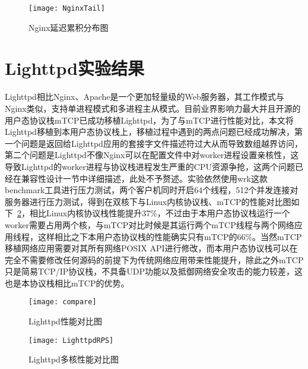 \vspace{-10pt}
\begin{figure}[H] %
  \centering
  \texttt{[image: NginxTail]}
  \caption{Nginx延迟累积分布图}
  \label{fig:NginxTail}
\end{figure}
\vspace{-10pt}

\section{Lighttpd实验结果}
Lighttpd相比Nginx、Apache是一个更加轻量级的Web服务器，其工作模式与Nginx类似，支持单进程模式和多进程主从模式。目前业界影响力最大并且开源的用户态协议栈mTCP已成功移植Lighttpd，为了与mTCP进行性能对比，本文将Lighttpd移植到本用户态协议栈上，移植过程中遇到的两点问题已经成功解决，第一个问题是返回给Lighttpd应用的套接字文件描述符过大从而导致数组越界访问，第二个问题是Lighttpd不像Nginx可以在配置文件中对worker进程设置亲核性，这导致Lighttpd的worker进程与协议栈进程发生严重的CPU资源争抢，这两个问题已经在兼容性设计一节中详细描述，此处不予赘述。实验依然使用wrk这款benchmark工具进行压力测试，两个客户机同时开启64个线程，512个并发连接对服务器进行压力测试，得到在双核下与Linux内核协议栈、mTCP的性能对比图如下~\ref{fig:compare}，相比Linux内核协议栈性能提升37\%，不过由于本用户态协议栈运行一个worker需要占用两个核，与mTCP对比时候是其运行两个mTCP线程与两个网络应用线程，这样相比之下本用户态协议栈的性能确实只有mTCP的66\%。当然mTCP移植网络应用需要对其所有网络POSIX API进行修改，而本用户态协议栈可以在完全不需要修改任何源码的前提下为传统网络应用带来性能提升，除此之外mTCP只是简易TCP/IP协议栈，不具备UDP功能以及抵御网络安全攻击的能力较差，这也是本协议栈相比mTCP的优势。

\vspace{-10pt}
\begin{figure}[H] %
  \centering
  \texttt{[image: compare]}
  \caption{Lighttpd性能对比图}
  \label{fig:compare}
\end{figure}
\vspace{-10pt}

\vspace{-10pt}
\begin{figure}[H] %
  \centering
  \texttt{[image: LighttpdRPS]}
  \caption{Lighttpd多核性能对比图}
  \label{fig:LighttpdRPS}
\end{figure}
\vspace{-10pt}

